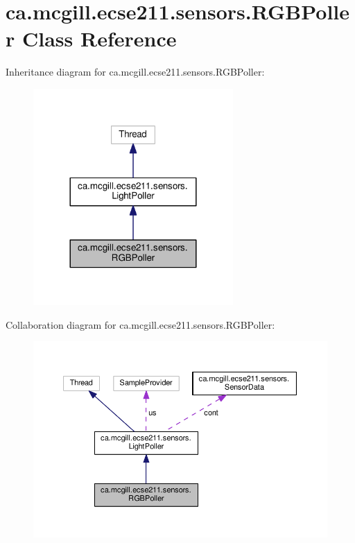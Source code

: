 \hypertarget{classca_1_1mcgill_1_1ecse211_1_1sensors_1_1_r_g_b_poller}{}\section{ca.\+mcgill.\+ecse211.\+sensors.\+R\+G\+B\+Poller Class Reference}
\label{classca_1_1mcgill_1_1ecse211_1_1sensors_1_1_r_g_b_poller}


Inheritance diagram for ca.\+mcgill.\+ecse211.\+sensors.\+R\+G\+B\+Poller\+:
\nopagebreak
\begin{figure}[H]
\begin{center}
\leavevmode
\includegraphics[width=216pt]{classca_1_1mcgill_1_1ecse211_1_1sensors_1_1_r_g_b_poller__inherit__graph}
\end{center}
\end{figure}


Collaboration diagram for ca.\+mcgill.\+ecse211.\+sensors.\+R\+G\+B\+Poller\+:
\nopagebreak
\begin{figure}[H]
\begin{center}
\leavevmode
\includegraphics[width=350pt]{classca_1_1mcgill_1_1ecse211_1_1sensors_1_1_r_g_b_poller__coll__graph}
\end{center}
\end{figure}
